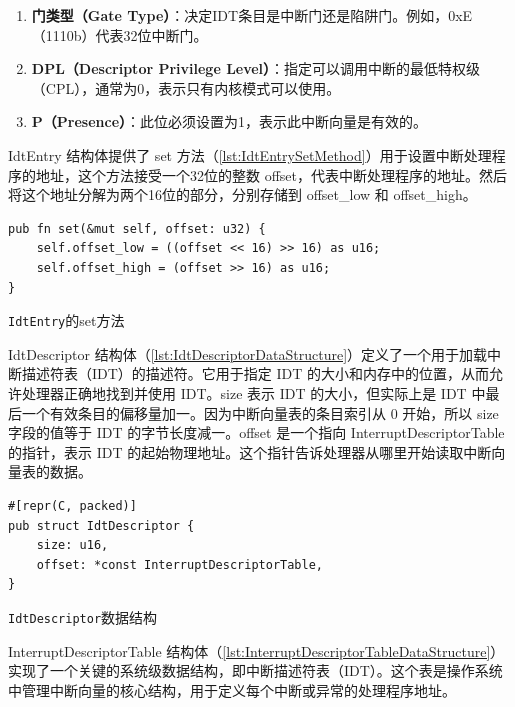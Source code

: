 \begin{enumerate}
    \item \textbf{门类型（Gate Type）}：决定IDT条目是中断门还是陷阱门。例如，0xE（1110b）代表32位中断门。
    \item \textbf{DPL（Descriptor Privilege Level）}：指定可以调用中断的最低特权级（CPL），通常为0，表示只有内核模式可以使用。
    \item \textbf{P（Presence）}：此位必须设置为1，表示此中断向量是有效的。
\end{enumerate}

IdtEntry 结构体提供了 set 方法（\cref{lst:IdtEntrySetMethod}）用于设置中断处理程序的地址，这个方法接受一个32位的整数 offset，代表中断处理程序的地址。然后将这个地址分解为两个16位的部分，分别存储到 offset\_low 和 offset\_high。

\begin{listing}[htbp]
    \begin{verbatim}
pub fn set(&mut self, offset: u32) {
    self.offset_low = ((offset << 16) >> 16) as u16;
    self.offset_high = (offset >> 16) as u16;
}
    \end{verbatim}
    \caption{\texttt{IdtEntry}的set方法}\label{lst:IdtEntrySetMethod}
\end{listing}

IdtDescriptor 结构体（\cref{lst:IdtDescriptorDataStructure}）定义了一个用于加载中断描述符表（IDT）的描述符。它用于指定 IDT 的大小和内存中的位置，从而允许处理器正确地找到并使用 IDT。size 表示 IDT 的大小，但实际上是 IDT 中最后一个有效条目的偏移量加一。因为中断向量表的条目索引从 0 开始，所以 size 字段的值等于 IDT 的字节长度减一。offset 是一个指向 InterruptDescriptorTable 的指针，表示 IDT 的起始物理地址。这个指针告诉处理器从哪里开始读取中断向量表的数据。

\begin{listing}[htbp]
    \begin{verbatim}
#[repr(C, packed)]
pub struct IdtDescriptor {
    size: u16,
    offset: *const InterruptDescriptorTable,
}
    \end{verbatim}
    \caption{\texttt{IdtDescriptor}数据结构}\label{lst:IdtDescriptorDataStructure}
\end{listing}

InterruptDescriptorTable 结构体（\cref{lst:InterruptDescriptorTableDataStructure}）实现了一个关键的系统级数据结构，即中断描述符表（IDT）。这个表是操作系统中管理中断向量的核心结构，用于定义每个中断或异常的处理程序地址。

